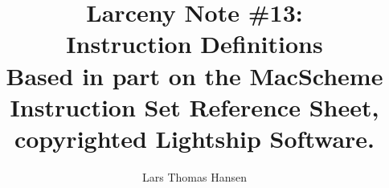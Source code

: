 %



\title{Larceny Note \#13: \\
       Instruction Definitions \\
       {\tenrm Based in part on the MacScheme Instruction
       Set Reference Sheet, copyrighted Lightship Software.}}
\author{Lars Thomas Hansen}


\maketitle

